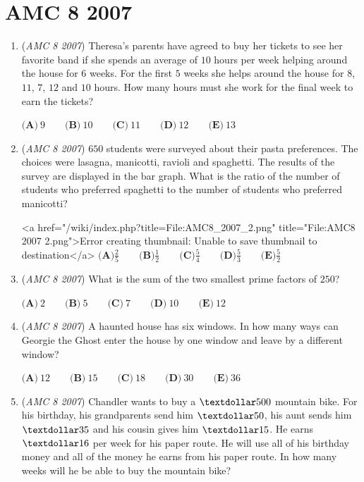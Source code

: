 \section{AMC 8 2007}
        \begin{enumerate}
        	\item (\textit{AMC 8 2007}) Theresa's parents have agreed to buy her tickets to see her favorite band if she spends an average of $10$ hours per week helping around the house for $6$ weeks. For the first $5$ weeks she helps around the house for $8$, $11$, $7$, $12$ and $10$ hours. How many hours must she work for the final week to earn the tickets?


 $\textbf{(A)}\ 9 \qquad\textbf{(B)}\ 10 \qquad\textbf{(C)}\ 11 \qquad\textbf{(D)}\ 12 \qquad\textbf{(E)}\ 13$


	\item (\textit{AMC 8 2007}) $650$ students were surveyed about their pasta preferences. The choices were lasagna, manicotti, ravioli and spaghetti. The results of the survey are displayed in the bar graph. What is the ratio of the number of students who preferred spaghetti to the number of students who preferred manicotti?


 <a href="/wiki/index.php?title=File:AMC8\_2007\_2.png" title="File:AMC8 2007 2.png">Error creating thumbnail: Unable to save thumbnail to destination</a>
$\textbf{(A)} \frac{2}{5} \qquad \textbf{(B)} \frac{1}{2} \qquad \textbf{(C)} \frac{5}{4} \qquad \textbf{(D)} \frac{5}{3} \qquad \textbf{(E)} \frac{5}{2}$


	\item (\textit{AMC 8 2007}) What is the sum of the two smallest prime factors of $250$?


 $\textbf{(A)}\ 2 \qquad\textbf{(B)}\ 5 \qquad\textbf{(C)}\ 7 \qquad\textbf{(D)}\ 10 \qquad\textbf{(E)}\ 12$


	\item (\textit{AMC 8 2007}) A haunted house has six windows. In how many ways can
Georgie the Ghost enter the house by one window and leave
by a different window?


 $\textbf{(A)}\ 12 \qquad\textbf{(B)}\ 15 \qquad\textbf{(C)}\ 18 \qquad\textbf{(D)}\ 30 \qquad\textbf{(E)}\ 36$


	\item (\textit{AMC 8 2007}) Chandler wants to buy a $\textdollar 500$ mountain bike. For his birthday, his grandparents
send him $\textdollar 50$, his aunt sends him $\textdollar 35$ and his cousin gives him $\textdollar 15$. He earns
$\textdollar 16$ per week for his paper route. He will use all of his birthday money and all
of the money he earns from his paper route. In how many weeks will he be able
to buy the mountain bike?



\end{enumerate}
